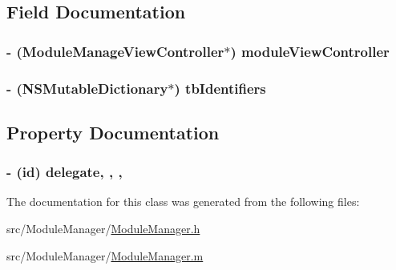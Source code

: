 \subsection{Field Documentation}
\hypertarget{interface_module_manager_a0360f8995e4b5f956ded98af3e220355}{
\subsubsection[{module\-View\-Controller}]{\setlength{\rightskip}{0pt plus 5cm}-\/ ({\bf Module\-Manage\-View\-Controller}$\ast$) module\-View\-Controller\hspace{0.3cm}{\ttfamily [protected]}}}\label{interface_module_manager_a0360f8995e4b5f956ded98af3e220355}
\hypertarget{interface_module_manager_a93d7f18be64aa1f313d2e619660cbef0}{
\subsubsection[{tb\-Identifiers}]{\setlength{\rightskip}{0pt plus 5cm}-\/ (N\-S\-Mutable\-Dictionary$\ast$) tb\-Identifiers\hspace{0.3cm}{\ttfamily [protected]}}}\label{interface_module_manager_a93d7f18be64aa1f313d2e619660cbef0}


\subsection{Property Documentation}
\hypertarget{interface_module_manager_a8d9332fcd23523b1e2520b8765577423}{
\subsubsection[{delegate}]{\setlength{\rightskip}{0pt plus 5cm}-\/ (id) delegate\hspace{0.3cm}{\ttfamily [read]}, {\ttfamily [write]}, {\ttfamily [atomic]}, {\ttfamily [assign]}}}\label{interface_module_manager_a8d9332fcd23523b1e2520b8765577423}


The documentation for this class was generated from the following files\-:\begin{DoxyCompactItemize}
\item 
src/\-Module\-Manager/\hyperlink{_module_manager_8h}{Module\-Manager.\-h}\item 
src/\-Module\-Manager/\hyperlink{_module_manager_8m}{Module\-Manager.\-m}\end{DoxyCompactItemize}
